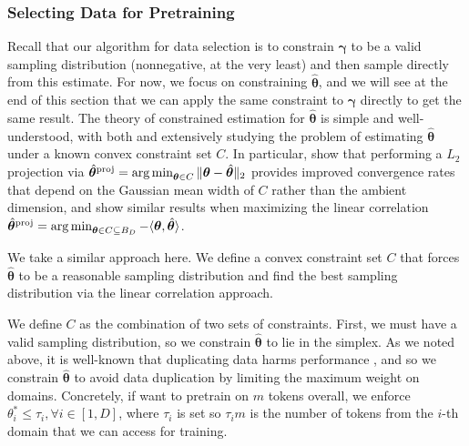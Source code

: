 \documentclass{article} %
\newcommand{\bmthproj}{\hat{\bm{\theta}}^{\textnormal{proj}}}
\begin{document}
\subsubsection{Selecting Data for Pretraining}
\label{pretraining}

Recall that our algorithm for data selection is to constrain $\bm{\gamma}$ to be a valid sampling distribution (nonnegative, at the very least) and then sample directly from this estimate. For now, we focus on constraining $\hat{\bm{\theta}}$, and we will see at the end of this section that we can apply the same constraint to $\bm{\gamma}$ directly to get the same result. The theory of constrained estimation for $\hat{\bm{\theta}}$ is simple and well-understood, with both \citet{plan2016high} and \citet{chen2017robust} extensively studying the problem of estimating $\hat{\bm{\theta}}$ under a known convex constraint set $C$. In particular, \citet{plan2016high} show that performing a $L_2$ projection via $\bmthproj = \argmin_{\bm{\theta} \in C}\|\bm{\theta} - \hat{\bm{\theta}} \|_2$ provides improved convergence rates that depend on the Gaussian mean width of $C$ rather than the ambient dimension, and \citet{chen2017robust} show similar results when maximizing the linear correlation $\bmthproj = \argmin_{\bm{\theta} \in C\subseteq B_D}-\langle\bm{\theta}, \hat{\bm{\theta}}\rangle$.

We take a similar approach here. We define a convex constraint set $C$ that forces $\hat{\bm{\theta}}$ to be a reasonable sampling distribution and find the best sampling distribution via the linear correlation approach. 

We define $C$ as the combination of two sets of constraints. First, we must have a valid sampling distribution, so we constrain $\hat{\bm{\theta}}$ to lie in the simplex. As we noted above, it is well-known that duplicating data harms performance \citep{semdedup}, and so we constrain $\hat{\bm{\theta}}$ to avoid data duplication by limiting the maximum weight on domains. Concretely, if want to pretrain on $m$ tokens overall, we enforce $\theta^*_i \leq \tau_i, \forall i \in [1,D]$, where $\tau_i$ is set so $\tau_im$ is the number of tokens from the $i$-th domain that we can access for training.
\end{document}
